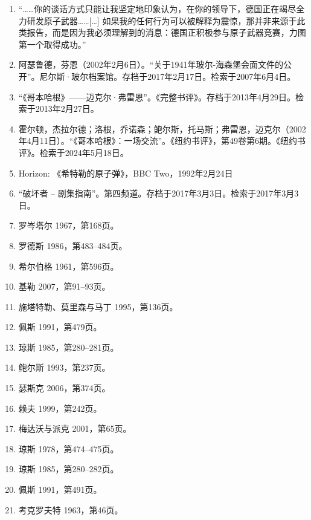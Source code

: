 \begin{enumerate}
\item “……你的谈话方式只能让我坚定地印象认为，在你的领导下，德国正在竭尽全力研发原子武器……[…] 如果我的任何行为可以被解释为震惊，那并非来源于此类报告，而是因为我必须理解到的消息：德国正积极参与原子武器竞赛，力图第一个取得成功。”
\item 阿瑟鲁德，芬恩（2002年2月6日）。“关于1941年玻尔-海森堡会面文件的公开”。尼尔斯·玻尔档案馆。存档于2017年2月17日。检索于2007年6月4日。
\item “《哥本哈根》——迈克尔·弗雷恩”。《完整书评》。存档于2013年4月29日。检索于2013年2月27日。
\item 霍尔顿，杰拉尔德；洛根，乔诺森；鲍尔斯，托马斯；弗雷恩，迈克尔（2002年4月11日）。“《哥本哈根》：一场交流”。《纽约书评》，第49卷第6期。《纽约书评》。检索于2024年5月18日。
\item Horizon: 《希特勒的原子弹》，BBC Two，1992年2月24日
\item “破坏者 – 剧集指南”。第四频道。存档于2017年3月3日。检索于2017年3月3日。
\item 罗岑塔尔 1967，第168页。

\item 罗德斯 1986，第483–484页。

\item 希尔伯格 1961，第596页。

\item 基勒 2007，第91–93页。

\item 施塔特勒、莫里森与马丁 1995，第136页。

\item 佩斯 1991，第479页。

\item 琼斯 1985，第280–281页。

\item 鲍尔斯 1993，第237页。

\item 瑟斯克 2006，第374页。

\item 赖夫 1999，第242页。

\item 梅达沃与派克 2001，第65页。

\item 琼斯 1978，第474–475页。

\item 琼斯 1985，第280–282页。

\item 佩斯 1991，第491页。

\item 考克罗夫特 1963，第46页。


\end{enumerate}
